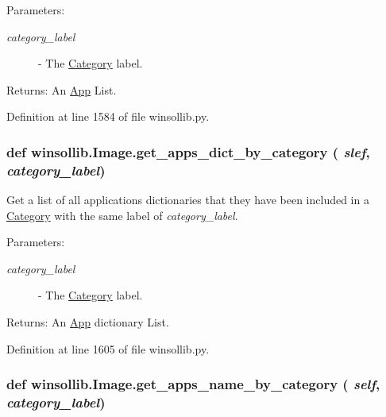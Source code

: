 \begin{Desc}
\item[Parameters:]
\begin{description}
\item[{\em category\_\-label}]- The \hyperlink{classwinsollib_1_1Category}{Category} label. \end{description}
\end{Desc}
\begin{Desc}
\item[Returns:]An \hyperlink{classwinsollib_1_1App}{App} List. \end{Desc}


Definition at line 1584 of file winsollib.py.\hypertarget{classwinsollib_1_1Image_1b2feb52e44154e0585bba1c1c3691be}{
\subsubsection[get\_\-apps\_\-dict\_\-by\_\-category]{\setlength{\rightskip}{0pt plus 5cm}def winsollib.Image.get\_\-apps\_\-dict\_\-by\_\-category ( {\em slef},  {\em category\_\-label})}}
\label{classwinsollib_1_1Image_1b2feb52e44154e0585bba1c1c3691be}


Get a list of all applications dictionaries that they have been included in a \hyperlink{classwinsollib_1_1Category}{Category} with the same label of {\em category\_\-label\/}. 

\begin{Desc}
\item[Parameters:]
\begin{description}
\item[{\em category\_\-label}]- The \hyperlink{classwinsollib_1_1Category}{Category} label. \end{description}
\end{Desc}
\begin{Desc}
\item[Returns:]An \hyperlink{classwinsollib_1_1App}{App} dictionary List. \end{Desc}


Definition at line 1605 of file winsollib.py.\hypertarget{classwinsollib_1_1Image_0de62253fdbd1ce1a517ad02bf189b49}{
\subsubsection[get\_\-apps\_\-name\_\-by\_\-category]{\setlength{\rightskip}{0pt plus 5cm}def winsollib.Image.get\_\-apps\_\-name\_\-by\_\-category ( {\em self},  {\em category\_\-label})}}
\label{classwinsollib_1_1Image_0de62253fdbd1ce1a517ad02bf189b49}


